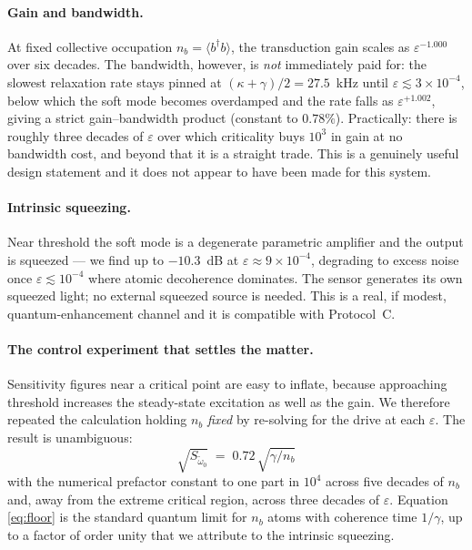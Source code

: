 \documentclass[11pt,a4paper]{article}
\newcommand{\dg}{^{\dagger}}
\newcommand{\wt}{\tilde{\omega}_{0}}
\newcommand{\avg}[1]{\langle #1 \rangle}
\begin{document}
\paragraph{Gain and bandwidth.} At fixed collective occupation $n_b=\avg{b\dg b}$, the
transduction gain scales as $\varepsilon^{-1.000}$ over six decades. The bandwidth, however,
is \emph{not} immediately paid for: the slowest relaxation rate stays pinned at
$(\kappa+\gamma)/2 = 27.5$~kHz until $\varepsilon \lesssim 3\times10^{-4}$, below which the
soft mode becomes overdamped and the rate falls as $\varepsilon^{+1.002}$, giving a strict
gain--bandwidth product (constant to $0.78\%$). Practically: there is roughly three decades
of $\varepsilon$ over which criticality buys $10^3$ in gain at no bandwidth cost, and beyond
that it is a straight trade. This is a genuinely useful design statement and it does not
appear to have been made for this system.

\paragraph{Intrinsic squeezing.} Near threshold the soft mode is a degenerate parametric
amplifier and the output is squeezed --- we find up to $-10.3$~dB at
$\varepsilon\approx9\times10^{-4}$, degrading to excess noise once
$\varepsilon\lesssim10^{-4}$ where atomic decoherence dominates. The sensor generates its own
squeezed light; no external squeezed source is needed. This is a real, if modest,
quantum-enhancement channel and it is compatible with Protocol~C.

\paragraph{The control experiment that settles the matter.}
Sensitivity figures near a critical point are easy to inflate, because approaching threshold
increases the steady-state excitation as well as the gain. We therefore repeated the
calculation holding $n_b$ \emph{fixed} by re-solving for the drive at each $\varepsilon$.
The result is unambiguous:
\begin{equation}
  \boxed{\;\sqrt{S_{\wt}} \;=\; 0.72\,\sqrt{\gamma/n_b}\;}
  \label{eq:floor}
\end{equation}
with the numerical prefactor constant to one part in $10^4$ across five decades of $n_b$ and,
away from the extreme critical region, across three decades of $\varepsilon$. Equation
\eqref{eq:floor} is the standard quantum limit for $n_b$ atoms with coherence time
$1/\gamma$, up to a factor of order unity that we attribute to the intrinsic squeezing.
\end{document}
